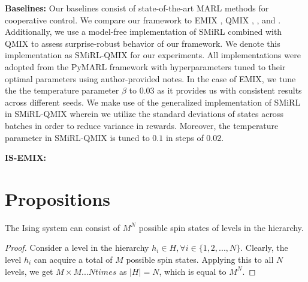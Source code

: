 \documentclass{article}
\begin{document}
\textbf{Baselines:} Our baselines consist of state-of-the-art MARL methods for cooperative control. We compare our framework to EMIX \cite{emix}, QMIX \cite{qmix}, \cite{vdn}, \cite{coma} and \cite{iql}. Additionally, we use a model-free implementation of SMiRL \cite{smirl} combined with QMIX to assess surprise-robust behavior of our framework. We denote this implementation as SMiRL-QMIX for our experiments. All implementations were adopted from the PyMARL \cite{smac} framework with hyperparameters tuned to their optimal parameters using author-provided notes. In the case of EMIX, we tune the the temperature parameter $\beta$ to $0.03$ as it provides us with consistent results across different seeds. We make use of the generalized implementation of SMiRL \cite{gen} in SMiRL-QMIX wherein we utilize the standard deviations of states across batches in order to reduce variance in rewards. Moreover, the temperature parameter in SMiRL-QMIX is tuned to $0.1$ in steps of $0.02$.

\textbf{IS-EMIX:}


\section{Propositions}

\begin{prop}{1}\label{one}
    The Ising system can consist of $M^{N}$ possible spin states of levels in the hierarchy.
\end{prop}
\begin{proof}
    Consider a level in the hierarchy $h_{i} \in H, \forall i \in \{1,2,...,N\}$. Clearly, the level $h_{i}$ can acquire a total of $M$ possible spin states. Applying this to all $N$ levels, we get $M \times M... N times$ as $|H| = N$, which is equal to $M^{N}$.  
\end{proof}
\end{document}
